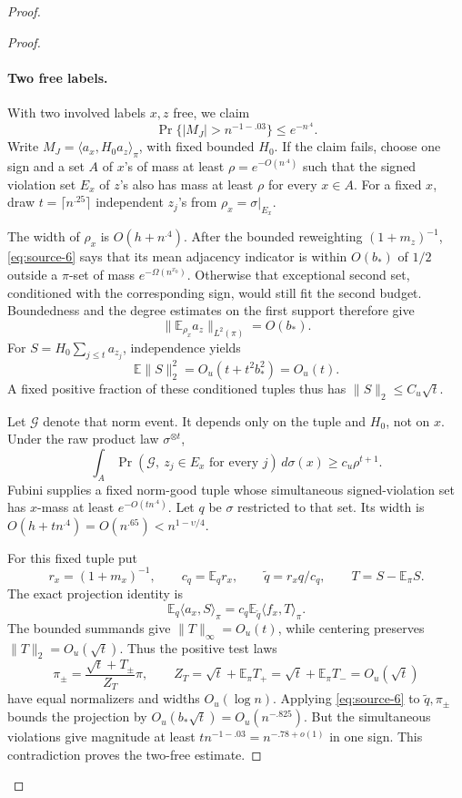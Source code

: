 \begin{proof}
\begin{proof}
\paragraph{Two free labels.}
With two involved labels \(x,z\) free, we claim
\[
 \Pr\{|M_J|>n^{-1-.03}\}\le e^{-n^{.4}}.
\]
Write \(M_J=\langle a_x,H_0a_z\rangle_\pi\), with fixed bounded \(H_0\). If the claim fails, choose one sign and a set \(A\) of \(x\)'s of mass at least \(\rho=e^{-O(n^{.4})}\) such that the signed violation set \(E_x\) of \(z\)'s also has mass at least \(\rho\) for every \(x\in A\). For a fixed \(x\), draw \(t=\lceil n^{.25}\rceil\) independent \(z_j\)'s from \(\rho_x=\sigma|_{E_x}\).

The width of \(\rho_x\) is \(O(h+n^{.4})\). After the bounded reweighting \((1+m_z)^{-1}\), \eqref{eq:source-6} says that its mean adjacency indicator is within \(O(b_*)\) of \(1/2\) outside a \(\pi\)-set of mass \(e^{-\Omega(n^{x_0})}\). Otherwise that exceptional second set, conditioned with the corresponding sign, would still fit the second budget. Boundedness and the degree estimates on the first support therefore give
\[
 \|\mathbb E_{\rho_x}a_z\|_{L^2(\pi)}=O(b_*).
\]
For \(S=H_0\sum_{j\le t}a_{z_j}\), independence yields
\[
 \mathbb E\|S\|_2^2=O_u(t+t^2b_*^2)=O_u(t).
\]
A fixed positive fraction of these conditioned tuples thus has \(\|S\|_2\le C_u\sqrt t\).

Let \(\mathcal G\) denote that norm event. It depends only on the tuple and \(H_0\), not on \(x\). Under the raw product law \(\sigma^{\otimes t}\),
\[
 \int_A\Pr(\mathcal G,\ z_j\in E_x\text{ for every }j)\,d\sigma(x)
       \ge c_u\rho^{t+1}.
\]
Fubini supplies a fixed norm-good tuple whose simultaneous signed-violation set has \(x\)-mass at least \(e^{-O(tn^{.4})}\). Let \(q\) be \(\sigma\) restricted to that set. Its width is
\(O(h+tn^{.4})=O(n^{.65})<n^{1-\upsilon/4}\).

For this fixed tuple put
\[
 r_x=(1+m_x)^{-1},\qquad c_q=\mathbb E_qr_x,\qquad
 \widetilde q=r_xq/c_q,\qquad T=S-\mathbb E_\pi S.
\]
The exact projection identity is
\[
 \mathbb E_q\langle a_x,S\rangle_\pi
       =c_q\mathbb E_{\widetilde q}\langle f_x,T\rangle_\pi.
\]
The bounded summands give \(\|T\|_\infty=O_u(t)\), while centering preserves \(\|T\|_2=O_u(\sqrt t)\). Thus the positive test laws
\[
 \pi_\pm=\frac{\sqrt t+T_\pm}{Z_T}\pi,\qquad
 Z_T=\sqrt t+\mathbb E_\pi T_+
     =\sqrt t+\mathbb E_\pi T_-=O_u(\sqrt t)
\]
have equal normalizers and widths \(O_u(\log n)\). Applying \eqref{eq:source-6} to \(\widetilde q,\pi_\pm\) bounds the projection by
\(O_u(b_*\sqrt t)=O_u(n^{-.825})\).
But the simultaneous violations give magnitude at least
\(t n^{-1-.03}=n^{-.78+o(1)}\)
in one sign. This contradiction proves the two-free estimate.


\end{proof}
\end{proof}
